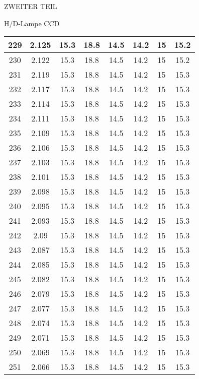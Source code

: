 \begin{appendix}
\begin{chapter}{ZWEITER TEIL}
\begin{section}{H/D-Lampe CCD}
\begin{scriptsize}
\begin{longtable}[htbp]{|c|c|c|c|c|c|c|c|}
            229 & 2.125 & 15.3 & 18.8 & 14.5 & 14.2 & 15 & 15.2 \\ \hline
            230 & 2.122 & 15.3 & 18.8 & 14.5 & 14.2 & 15 & 15.2 \\ \hline
            231 & 2.119 & 15.3 & 18.8 & 14.5 & 14.2 & 15 & 15.3 \\ \hline
            232 & 2.117 & 15.3 & 18.8 & 14.5 & 14.2 & 15 & 15.3 \\ \hline
            233 & 2.114 & 15.3 & 18.8 & 14.5 & 14.2 & 15 & 15.3 \\ \hline
            234 & 2.111 & 15.3 & 18.8 & 14.5 & 14.2 & 15 & 15.3 \\ \hline
            235 & 2.109 & 15.3 & 18.8 & 14.5 & 14.2 & 15 & 15.3 \\ \hline
            236 & 2.106 & 15.3 & 18.8 & 14.5 & 14.2 & 15 & 15.3 \\ \hline
            237 & 2.103 & 15.3 & 18.8 & 14.5 & 14.2 & 15 & 15.3 \\ \hline
            238 & 2.101 & 15.3 & 18.8 & 14.5 & 14.2 & 15 & 15.3 \\ \hline
            239 & 2.098 & 15.3 & 18.8 & 14.5 & 14.2 & 15 & 15.3 \\ \hline
            240 & 2.095 & 15.3 & 18.8 & 14.5 & 14.2 & 15 & 15.3 \\ \hline
            241 & 2.093 & 15.3 & 18.8 & 14.5 & 14.2 & 15 & 15.3 \\ \hline
            242 & 2.09 & 15.3 & 18.8 & 14.5 & 14.2 & 15 & 15.3 \\ \hline
            243 & 2.087 & 15.3 & 18.8 & 14.5 & 14.2 & 15 & 15.3 \\ \hline
            244 & 2.085 & 15.3 & 18.8 & 14.5 & 14.2 & 15 & 15.3 \\ \hline
            245 & 2.082 & 15.3 & 18.8 & 14.5 & 14.2 & 15 & 15.3 \\ \hline
            246 & 2.079 & 15.3 & 18.8 & 14.5 & 14.2 & 15 & 15.3 \\ \hline
            247 & 2.077 & 15.3 & 18.8 & 14.5 & 14.2 & 15 & 15.3 \\ \hline
            248 & 2.074 & 15.3 & 18.8 & 14.5 & 14.2 & 15 & 15.3 \\ \hline
            249 & 2.071 & 15.3 & 18.8 & 14.5 & 14.2 & 15 & 15.3 \\ \hline
            250 & 2.069 & 15.3 & 18.8 & 14.5 & 14.2 & 15 & 15.3 \\ \hline
            251 & 2.066 & 15.3 & 18.8 & 14.5 & 14.2 & 15 & 15.3 \\ \hline

\end{longtable}
\end{scriptsize}
\end{section}
\end{chapter}
\end{appendix}
